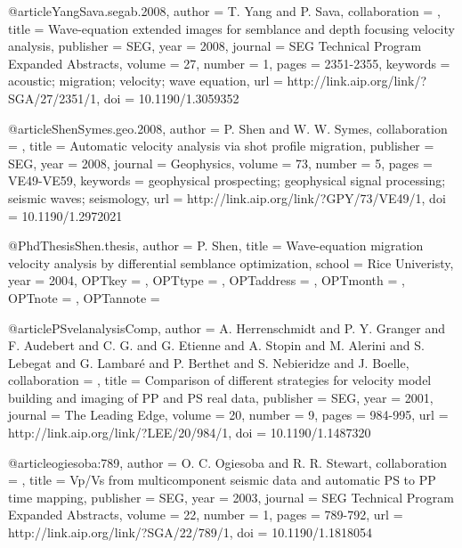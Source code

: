 {@article{YangSava.segab.2008,
author = {T. Yang and P. Sava},
collaboration = {},
title = {Wave-equation extended images for semblance and depth focusing velocity analysis},
publisher = {SEG},
year = {2008},
journal = {SEG Technical Program Expanded Abstracts},
volume = {27},
number = {1},
pages = {2351-2355},
keywords = {acoustic; migration; velocity; wave equation},
url = {http://link.aip.org/link/?SGA/27/2351/1},
doi = {10.1190/1.3059352}
}



@article{ShenSymes.geo.2008,
author = {P. Shen and W. W. Symes},
collaboration = {},
title = {Automatic velocity analysis via shot profile migration},
publisher = {SEG},
year = {2008},
journal = {Geophysics},
volume = {73},
number = {5},
pages = {VE49-VE59},
keywords = {geophysical prospecting; geophysical signal processing; seismic waves; seismology},
url = {http://link.aip.org/link/?GPY/73/VE49/1},
doi = {10.1190/1.2972021}
}






@PhdThesis{Shen.thesis,
  author = 	 {P. Shen},
  title = 	 {Wave-equation migration velocity analysis by
                  differential semblance optimization},
  school = 	 {Rice Univeristy},
  year = 	 {2004},
  OPTkey = 	 {},
  OPTtype = 	 {},
  OPTaddress = 	 {},
  OPTmonth = 	 {},
  OPTnote = 	 {},
  OPTannote = 	 {}
}

@article{PSvelanalysisComp,
author = {A. Herrenschmidt and P. Y. Granger and
                  F. Audebert and C. G. and
                  G. Etienne and A. Stopin and M.
                  Alerini and S. Lebegat and G. Lambar\'{e}
                  and P. Berthet and S. Nebieridze and
                  J. Boelle},
collaboration = {},
title = {Comparison of different strategies for velocity model
                  building and imaging of {PP} and {PS} real data},
publisher = {SEG},
year = {2001},
journal = {The Leading Edge},
volume = {20},
number = {9},
pages = {984-995},
url = {http://link.aip.org/link/?LEE/20/984/1},
doi = {10.1190/1.1487320}
}









@article{ogiesoba:789,
author = {O. C. Ogiesoba and R. R. Stewart},
collaboration = {},
title = {Vp/{V}s from multicomponent seismic data and automatic {PS}
                  to {PP} time mapping},
publisher = {SEG},
year = {2003},
journal = {SEG Technical Program Expanded Abstracts},
volume = {22},
number = {1},
pages = {789-792},
url = {http://link.aip.org/link/?SGA/22/789/1},
doi = {10.1190/1.1818054}
}





}
